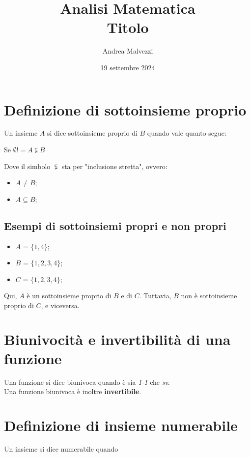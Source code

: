 \documentclass[12pt]{article}
\title{\textbf{Analisi Matematica\\Titolo}}
\date{19 settembre 2024}
\author{Andrea Malvezzi}
\begin{document}
\maketitle
\pagebreak
\section{Definizione di sottoinsieme proprio}
Un insieme $A$ si dice sottoinsieme proprio di $B$ quando vale quanto segue:
\begin{center}
    Se $\emptyset != A \subsetneqq B$
\end{center}
Dove il simbolo $\subsetneqq$ sta per "inclusione stretta", ovvero:
\begin{itemize}
    \item $A \not= B$;
    \item $A \subseteq B$;
\end{itemize}
\subsection{Esempi di sottoinsiemi propri e non propri}
\begin{itemize}
    \item $A$ = $\{1, 4\}$;
    \item $B$ = $\{1, 2, 3, 4\}$;
    \item $C$ = $\{1, 2, 3, 4\}$;
\end{itemize}
Qui, $A$ è un sottoinsieme proprio di $B$ e di $C$. Tuttavia, $B$ non è sottoinsieme proprio di $C$, e viceversa.
\section{Biunivocità e invertibilità di una funzione}
Una funzione si dice biunivoca quando è sia \textit{1-1} che \textit{sv}.\\
Una funzione biunivoca è inoltre \textbf{invertibile}.
\section{Definizione di insieme numerabile}
Un insieme si dice numerabile quando 
\end{document}
